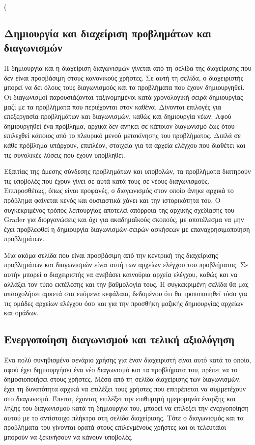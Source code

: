\documentclass[diploma]{softlab-thesis}
\begin{document}
(%
\subsection{Δημιουργία και διαχείριση προβλημάτων και διαγωνισμών}

Η δημιουργία και η διαχείριση διαγωνισμών γίνεται από τη σελίδα της διαχείρισης
που δεν είναι προσβάσιμη στους κανονικούς χρήστες. Σε αυτή τη σελίδα, ο
διαχειριστής μπορεί να δει όλους τους διαγωνισμούς και τα προβλήματα που έχουν
δημιουργηθεί. Οι διαγωνισμοί παρουσιάζονται ταξινομημένοι κατά χρονολογική
σειρά δημιουργίας μαζί με τα προβλήματα που περιέχονται στον καθένα. Δίνονται
επιλογές για επεξεργασία προβλημάτων και διαγωνισμών, καθώς και δημιουργία
νέων. Αφού δημιουργηθεί ένα πρόβλημα, αρχικά δεν ανήκει σε κάποιον διαγωνισμό
έως ότου επιλεχθεί κάποιος από το πλευρικό μενού μετακίνησης του προβλήματος.
Διπλά σε κάθε πρόβλημα υπάρχουν, επιπλέον, στοιχεία για τα αρχεία ελέγχου που
διαθέτει και τις συνολικές λύσεις που έχουν υποβληθεί.

\bigskip

Εξαιτίας της άμεσης σύνδεσης προβλημάτων και υποβολών, τα προβλήματα διατηρούν
τις υποβολές που έχουν γίνει σε αυτά κατά τους σε νέους διαγωνισμούς.
Επιπροσθέτως, όπως είναι προφανές, ο διαγωνισμός στον οποίο άνηκε αρχικά το
πρόβλημα φαίνεται κενός και ουσιαστικά χάνει και την ιστορικότητα του. Ο
συγκεκριμένος τρόπος λειτουργίας αποτελεί απόρροια της αρχικής σχεδίασης του
Grader για διοργανώσεις και όχι για ακαδημαϊκούς σκοπούς, με αποτέλεσμα να μην
έχει προβλεφθεί η δημιουργία διαγωνισμών-σειρών ασκήσεων με επαναχρησιμοποίηση
προβλημάτων.

\bigskip

Μια ακόμα σελίδα που είναι προσβάσιμη από την κεντρική της διαχείρισης προβλημάτων
και διαγωνισμών είναι αυτή των αρχείων ελέγχου του προβλήματος. Σε αυτήν μπορεί
ο διαχειριστής να ανεβάσει καινούρια αρχεία ελέγχου, καθώς και να αλλάξει τον τύπο
εκτέλεσης και την βαθμολογία τους. Η συγκεκριμένη σελίδα θα μας απασχολήσει αρκετά
στα επόμενα κεφάλαια, δεδομένου ότι θα τροποποιηθεί τόσο για τις ομάδες αρχείων
ελέγχου όσο και για την προσθήκη μαζικής δημιουργίας αρχείων και ομάδων.

\subsection{Ενεργοποίηση διαγωνισμού και τελική αξιολόγηση}

Ένα πολύ συνηθισμένο σενάριο χρήσης για έναν διαχειριστή είναι αυτό κατά το
οποίο, αφού έχει δημιουργήσει ένα νέο διαγωνισμό και τα προβλήματα του, πρέπει
να το δημοσιοποιήσει στους χρήστες. Μέσα από τη σελίδα διαχείρισης των
διαγωνισμών, έχει τη δυνατότητα αρχικά να επιλέξει τους χρήστες που επιτρέπεται
να συμμετέχουν στο διαγωνισμό. Έπειτα, έχοντας επιλέξει την επιθυμητή
ημερομηνία έναρξης και λήξης του διαγωνισμού κατά τη δημιουργία του, μπορεί να
επιλέξει την ενεργοποίηση αυτού με το αντίστοιχο πλήκτρο στη σελίδα
διαχείρισης. Τότε ο διαγωνισμός και τα προβλήματα του γίνονται ορατά στους
επιλεγμένους χρήστες και οι τελευταίοι μπορούν να ξεκινήσουν να κάνουν
υποβολές.
\end{document}
